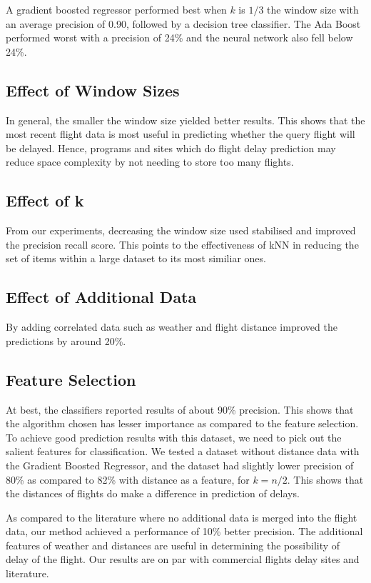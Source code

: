 \documentclass[letterpaper,11pt]{article}
\begin{document}
A gradient boosted regressor performed best when $k$ is $1/3$ the window size with an average precision of 0.90, followed by a decision tree classifier. The Ada Boost performed worst with a precision of 24\% and the neural network also fell below 24\%. 

\subsection{Effect of Window Sizes}
In general, the smaller the window size yielded better results. This shows that the most recent flight data is most useful in predicting whether the query flight will be delayed. Hence, programs and sites which do flight delay prediction may reduce space complexity by not needing to store too many flights. 

\subsection{Effect of k}
From our experiments, decreasing the window size used stabilised and improved the precision recall score. This points to the effectiveness of kNN in reducing the set of items within a large dataset to its most similiar ones.

\subsection{Effect of Additional Data}
By adding correlated data such as weather and flight distance improved the predictions by around 20\%.

\subsection{Feature Selection} 
At best, the classifiers reported results of about 90\% precision. This shows that the algorithm chosen has lesser importance as compared to the feature selection. To achieve good prediction results with this dataset, we need to pick out the salient features for classification. We tested a dataset without distance data with the Gradient Boosted Regressor, and the dataset had slightly lower precision of 80\% as compared to 82\% with distance as a feature, for $k=n/2$. This shows that the distances of flights do make a difference in prediction of delays. 

As compared to the literature where no additional data is merged into the flight data, our method achieved a performance of 10\% better precision. The additional features of weather and distances are useful in determining the possibility of delay of the flight. Our results are on par with commercial flights delay sites and literature. 
\end{document}
